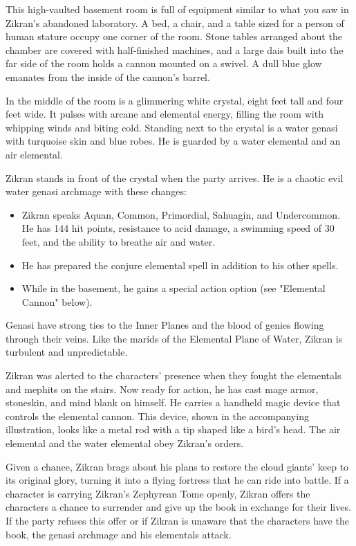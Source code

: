 \documentclass[10pt,a4paper,twoside,bg=print,twocolumn,openany,nodeprecatedcode]{dndbook}
\begin{document}
\begin{DndReadAloud}{}
This high-vaulted basement room is full of equipment similar to what you saw in Zikran's abandoned laboratory. A bed, a chair, and a table sized for a person of human stature occupy one corner of the room. Stone tables arranged about the chamber are covered with half-finished machines, and a large dais built into the far side of the room holds a cannon mounted on a swivel. A dull blue glow emanates from the inside of the cannon's barrel.

In the middle of the room is a glimmering white crystal, eight feet tall and four feet wide. It pulses with arcane and elemental energy, filling the room with whipping winds and biting cold. Standing next to the crystal is a water genasi with turquoise skin and blue robes. He is guarded by a water elemental and an air elemental.

\end{DndReadAloud}

Zikran stands in front of the crystal when the party arrives. He is a chaotic evil water genasi archmage with these changes:


\begin{itemize}
\item Zikran speaks Aquan, Common, Primordial, Sahuagin, and Undercommon. He has 144 hit points, resistance to acid damage, a swimming speed of 30 feet, and the ability to breathe air and water.
\item He has prepared the conjure elemental spell in addition to his other spells.
\item While in the basement, he gains a special action option (see "Elemental Cannon" below).
\end{itemize}

Genasi have strong ties to the Inner Planes and the blood of genies flowing through their veins. Like the marids of the Elemental Plane of Water, Zikran is turbulent and unpredictable.

Zikran was alerted to the characters' presence when they fought the elementals and mephits on the stairs. Now ready for action, he has cast mage armor, stoneskin, and mind blank on himself. He carries a handheld magic device that controls the elemental cannon. This device, shown in the accompanying illustration, looks like a metal rod with a tip shaped like a bird's head. The air elemental and the water elemental obey Zikran's orders.

Given a chance, Zikran brags about his plans to restore the cloud giants' keep to its original glory, turning it into a flying fortress that he can ride into battle. If a character is carrying Zikran's Zephyrean Tome openly, Zikran offers the characters a chance to surrender and give up the book in exchange for their lives. If the party refuses this offer or if Zikran is unaware that the characters have the book, the genasi archmage and his elementals attack.
\end{document}
